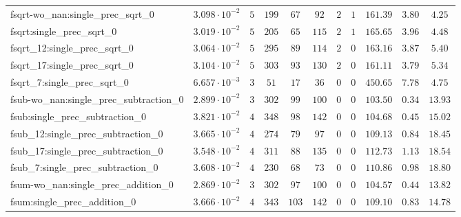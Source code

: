 \begin{tabular}{|l|c|c|c|c|c|c|c|c|c|c|}
fsqrt-wo\_nan:single\_prec\_sqrt\_0            & $ 3.098 \cdot 10^{-2} $ & $ 5      $ & $ 199    $ & $ 67    $ & $ 92    $ & $ 2   $ & $ 1 $ & $ 161.39      $ & $ 3.80    $ & $ 4.25    $ \\
fsqrt:single\_prec\_sqrt\_0                    & $ 3.019 \cdot 10^{-2} $ & $ 5      $ & $ 205    $ & $ 65    $ & $ 115   $ & $ 2   $ & $ 1 $ & $ 165.65      $ & $ 3.96    $ & $ 4.48    $ \\
fsqrt\_12:single\_prec\_sqrt\_0                & $ 3.064 \cdot 10^{-2} $ & $ 5      $ & $ 295    $ & $ 89    $ & $ 114   $ & $ 2   $ & $ 0 $ & $ 163.16      $ & $ 3.87    $ & $ 5.40    $ \\
fsqrt\_17:single\_prec\_sqrt\_0                & $ 3.104 \cdot 10^{-2} $ & $ 5      $ & $ 303    $ & $ 93    $ & $ 130   $ & $ 2   $ & $ 0 $ & $ 161.11      $ & $ 3.79    $ & $ 5.34    $ \\
fsqrt\_7:single\_prec\_sqrt\_0                 & $ 6.657 \cdot 10^{-3} $ & $ 3      $ & $ 51     $ & $ 17    $ & $ 36    $ & $ 0   $ & $ 0 $ & $ 450.65      $ & $ 7.78    $ & $ 4.75    $ \\
fsub-wo\_nan:single\_prec\_subtraction\_0      & $ 2.899 \cdot 10^{-2} $ & $ 3      $ & $ 302    $ & $ 99    $ & $ 100   $ & $ 0   $ & $ 0 $ & $ 103.50      $ & $ 0.34    $ & $ 13.93   $ \\
fsub:single\_prec\_subtraction\_0              & $ 3.821 \cdot 10^{-2} $ & $ 4      $ & $ 348    $ & $ 98    $ & $ 142   $ & $ 0   $ & $ 0 $ & $ 104.68      $ & $ 0.45    $ & $ 15.02   $ \\
fsub\_12:single\_prec\_subtraction\_0          & $ 3.665 \cdot 10^{-2} $ & $ 4      $ & $ 274    $ & $ 79    $ & $ 97    $ & $ 0   $ & $ 0 $ & $ 109.13      $ & $ 0.84    $ & $ 18.45   $ \\
fsub\_17:single\_prec\_subtraction\_0          & $ 3.548 \cdot 10^{-2} $ & $ 4      $ & $ 311    $ & $ 88    $ & $ 135   $ & $ 0   $ & $ 0 $ & $ 112.73      $ & $ 1.13    $ & $ 18.54   $ \\
fsub\_7:single\_prec\_subtraction\_0           & $ 3.608 \cdot 10^{-2} $ & $ 4      $ & $ 230    $ & $ 68    $ & $ 73    $ & $ 0   $ & $ 0 $ & $ 110.86      $ & $ 0.98    $ & $ 18.80   $ \\
fsum-wo\_nan:single\_prec\_addition\_0         & $ 2.869 \cdot 10^{-2} $ & $ 3      $ & $ 302    $ & $ 97    $ & $ 100   $ & $ 0   $ & $ 0 $ & $ 104.57      $ & $ 0.44    $ & $ 13.82   $ \\
fsum:single\_prec\_addition\_0                 & $ 3.666 \cdot 10^{-2} $ & $ 4      $ & $ 343    $ & $ 103   $ & $ 142   $ & $ 0   $ & $ 0 $ & $ 109.10      $ & $ 0.83    $ & $ 14.78   $ \\

\end{tabular}
